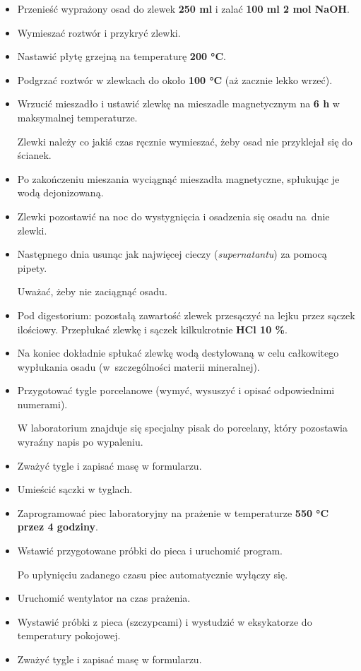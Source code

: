 \documentclass[
  letterpaper,
  DIV=11,
  numbers=noendperiod]{scrreprt}
\providecommand{\tightlist}{%
  \setlength{\itemsep}{0pt}\setlength{\parskip}{0pt}}\usepackage{longtable,booktabs,array}
\begin{document}
\begin{itemize}
\item
  Przenieść wyprażony osad do zlewek \textbf{250 ml} i zalać \textbf{100
  ml 2 mol NaOH}.
\item
  Wymieszać roztwór i przykryć zlewki.
\item
  Nastawić płytę grzejną na temperaturę \textbf{200 °C}.
\item
  Podgrzać roztwór w zlewkach do około \textbf{100 °C} (aż zacznie lekko
  wrzeć).
\item
  Wrzucić mieszadło i ustawić zlewkę na mieszadle magnetycznym na
  \textbf{6 h} w maksymalnej temperaturze.

  Zlewki należy co jakiś czas ręcznie wymieszać, żeby osad nie
  przyklejał się do ścianek.
\item
  Po zakończeniu mieszania wyciągnąć mieszadła magnetyczne, spłukując je
  wodą dejonizowaną.
\item
  Zlewki pozostawić na noc do wystygnięcia i osadzenia się osadu na~dnie
  zlewki.
\item
  Następnego dnia usunąc jak najwięcej cieczy (\emph{supernatantu}) za
  pomocą pipety.

  Uważać, żeby nie zaciągnąć osadu.
\item
  Pod digestorium: pozostałą zawartość zlewek przesączyć na lejku przez
  sączek ilościowy. Przepłukać zlewkę i sączek kilkukrotnie \textbf{HCl
  10 \%}.
\item
  Na koniec dokładnie spłukać zlewkę wodą destylowaną w celu całkowitego
  wypłukania osadu (w~szczególności materii mineralnej).
\item
  Przygotować tygle porcelanowe (wymyć, wysuszyć i opisać odpowiednimi
  numerami).

  W laboratorium znajduje się specjalny pisak do porcelany, który
  pozostawia wyraźny napis po wypaleniu.
\item
  Zważyć tygle i zapisać masę w formularzu.
\item
  Umieścić sączki w tyglach.
\end{itemize}

\begin{itemize}
\tightlist
\item
  Zaprogramować piec laboratoryjny na prażenie w temperaturze
  \textbf{550 °C przez 4 godziny}.
\end{itemize}

\begin{itemize}
\item
  Wstawić przygotowane próbki do pieca i uruchomić program.

  Po upłynięciu zadanego czasu piec automatycznie wyłączy się.
\item
  Uruchomić wentylator na czas prażenia.
\item
  Wystawić próbki z pieca (szczypcami) i wystudzić w eksykatorze do
  temperatury pokojowej.
\item
  Zważyć tygle i zapisać masę w formularzu.\newpage{}
\end{itemize}
\end{document}
